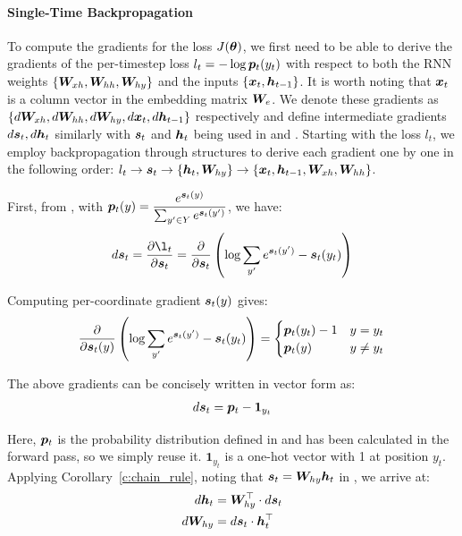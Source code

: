 \paragraph{Single-Time Backpropagation} To compute the gradients for the loss $J(\bm{\theta})$,
we first need to be able to derive the gradients of the per-timestep loss $l_t
=-\log \bm{p}_{t}(y_t)$ with respect to both the RNN weights
$\{\bm{W}_{xh}, \bm{W}_{hh}, \bm{W}_{hy}\}$ and the inputs $\{\bm{x}_{t}, \bm{h}_{t-1}\}$. It is worth
noting that
$\bm{x}_{t}$ is a column vector in the embedding matrix $\bm{W}_{e}$. We denote
these gradients as $\{d\bm{W}_{xh}, d\bm{W}_{hh}, d\bm{W}_{hy}, d\bm{x}_{t}, d\bm{h}_{t-1}\}$
respectively and define intermediate gradients $d\bm{s}_{t}, d\bm{h}_{t}$ similarly
with $\bm{s}_{t}$ and $\bm{h}_{t}$ being used in  and . 
Starting with the loss $l_t$, we employ backpropagation through structures
\cite{goller:ieeenn00} to derive each gradient one by one in the following
order: $l_t \rightarrow \bm{s}_{t} \rightarrow \{\bm{h}_{t}, \bm{W}_{hy}\} \rightarrow
\{\bm{x}_{t}, \bm{h}_{t-1}, \bm{W}_{xh}, \bm{W}_{hh}\}$. 

First, from , with $\bm{p}_{t}(y) = \dfrac{e^{\bm{s}_{t}(y)}}{\sum_{y' \in Y}
e^{\bm{s}_{t}(y')}}$, we have:
\begin{align}
d\s{t} = \fracder{\l_t}{\s{t}} = \parfrac{\s{t}} \paren{\log \sum_{y'} e^{\s{t}(y')} - \s{t}(y_t)}
\end{align}

Computing per-coordinate gradient $\bm{s}_{t}(y)$ gives:
\begin{align}
 \frac{\partial}{\partial \bm{s}_{t}(y)} \left(\log \sum_{y'} e^{\bm{s}_{t}(y')} - \bm{s}_{t}(y_t)\right) =
  \begin{cases}
   \bm{p}_{t}(y_t) - 1 & y = y_t \\
   \bm{p}_{t}(y) & y \neq y_t
  \end{cases}
\end{align}

The above gradients can be concisely written in vector form as:
\begin{align}
d\bm{s}_{t} = \bm{p}_{t} - \bm{1}_{y_t}
\end{align}

Here, $\bm{p}_{t}$ is the probability distribution defined in  and has
been calculated in the forward pass,
so we simply reuse it. $\bm{1}_{y_t}$ is a one-hot vector with 1 at position
$y_t$. 
Applying Corollary~\ref{c:chain_rule}, noting that $\bm{s}_{t} = \bm{W}_{hy}\bm{h}_{t}$ in
, we
arrive at:
\begin{align}
d\bm{h}_{t} &=  \bm{W}_{hy}^\top \cdot d\bm{s}_{t} \label{e:grad_ht}\\
d\bm{W}_{hy} &=  d\bm{s}_{t} \cdot \bm{h}_{t}^\top \label{e:grad_Why}
\end{align}

